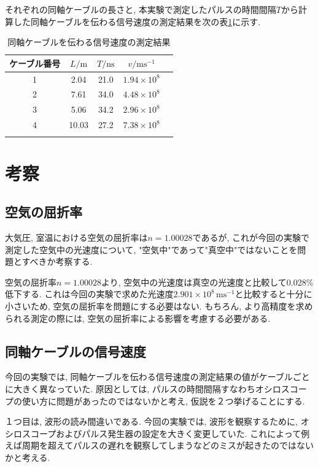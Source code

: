 \documentclass{jarticle}
\begin{document}
それぞれの同軸ケーブルの長さと, 本実験で測定したパルスの時間間隔$T$から計算した同軸ケーブルを伝わる信号速度の測定結果を次の表\ref{tb:cable-result}に示す.

\begin{table}[h]
  \centering
  \caption{同軸ケーブルを伝わる信号速度の測定結果}
  \begin{tabular}{ccccc}
    \hline
    ケーブル番号 & $L/\mathrm{m}$ & $T/\mathrm{ns}$ & $v/\mathrm{ms^{-1}}$ \\
    \hline
    1 & 2.04 & 21.0 & $1.94\times10^8$ \\
    2 & 7.61 & 34.0 & $4.48\times10^8$ \\
    3 & 5.06 & 34.2 & $2.96\times10^8$ \\
    4 & 10.03 & 27.2 & $7.38\times10^8$ \\
    \hline
    \label{tb:cable-result}
  \end{tabular}
\end{table}



\section{考察}


\subsection{空気の屈折率}

大気圧, 室温における空気の屈折率は$n=1.00028$であるが, これが今回の実験で測定した空気中の光速度について, "空気中"であって"真空中"ではないことを問題とすべきか考察する.

空気の屈折率$n=1.00028$より, 空気中の光速度は真空の光速度と比較して0.028\%低下する.
これは今回の実験で求めた光速度$2.901\times10^8\,\mathrm{ms^{-1}}$と比較すると十分に小さいため, 空気の屈折率を問題にする必要はない. もちろん, より高精度を求められる測定の際には, 空気の屈折率による影響を考慮する必要がある.


\subsection{同軸ケーブルの信号速度}

今回の実験では, 同軸ケーブルを伝わる信号速度の測定結果の値がケーブルごとに大きく異なっていた.
原因としては, パルスの時間間隔すなわちオシロスコープの使い方に問題があったのではないかと考え, 仮説を２つ挙げることにする.

１つ目は, 波形の読み間違いである.
今回の実験では, 波形を観察するために, オシロスコープおよびパルス発生器の設定を大きく変更していた.
これによって例えば周期を超えてパルスの遅れを観察してしまうなどのミスが起きたのではないかと考える.
\end{document}
